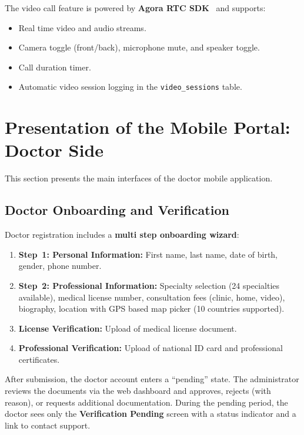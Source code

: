 \documentclass[12pt,a4paper,oneside]{report}
\begin{document}
The video call feature is powered by \textbf{Agora RTC SDK}~\cite{agora} and supports:

\begin{itemize}
    \item Real time video and audio streams.
    \item Camera toggle (front/back), microphone mute, and speaker toggle.
    \item Call duration timer.
    \item Automatic video session logging in the \texttt{video\_sessions} table.
\end{itemize}

\section{Presentation of the Mobile Portal: Doctor Side}

This section presents the main interfaces of the doctor mobile application.

\subsection{Doctor Onboarding and Verification}

Doctor registration includes a \textbf{multi step onboarding wizard}:

\begin{enumerate}
    \item \textbf{Step~1: Personal Information:} First name, last name, date of birth, gender, phone number.
    \item \textbf{Step~2: Professional Information:} Specialty selection (24 specialties available), medical license number, consultation fees (clinic, home, video), biography, location with GPS based map picker (10 countries supported).
    \item \textbf{License Verification:} Upload of medical license document.
    \item \textbf{Professional Verification:} Upload of national ID card and professional certificates.
\end{enumerate}

After submission, the doctor account enters a ``pending'' state. The administrator reviews the documents via the web dashboard and approves, rejects (with reason), or requests additional documentation. During the pending period, the doctor sees only the \textbf{Verification Pending} screen with a status indicator and a link to contact support.
\end{document}
